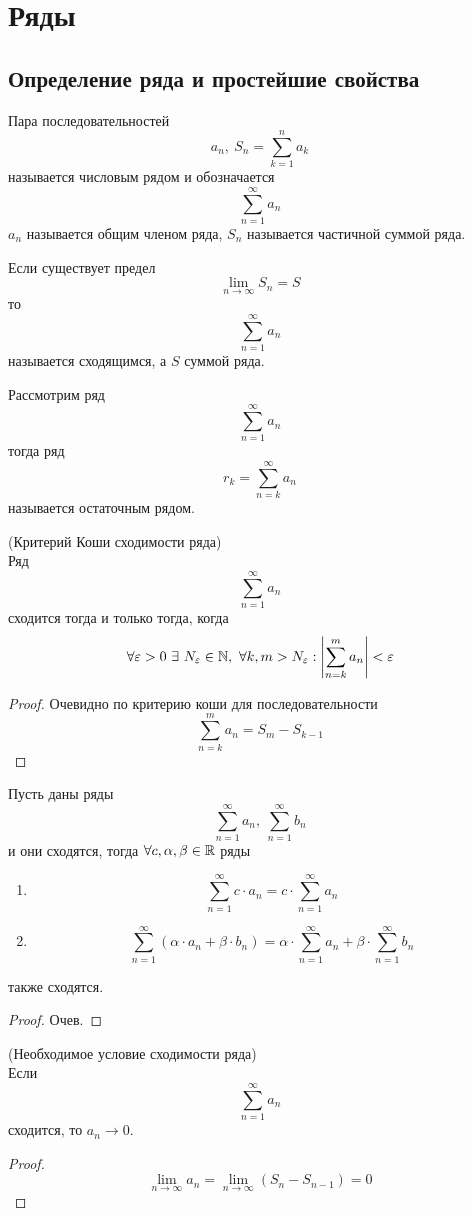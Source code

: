 \section{Ряды}
\subsection{Определение ряда и простейшие свойства}
\begin{definition}
    Пара последовательностей
    \[a_n,\ S_n=\sum_{k=1}^{n}a_k\]
    называется числовым рядом и обозначается
    \[\sum_{n=1}^{\infty}a_n\]
    $a_n$ называется общим членом ряда, $S_n$ называется частичной суммой ряда.
\end{definition}
\begin{definition}
    Если существует предел
    \[\lim\limits_{n\to \infty}S_n=S\]
    то 
    \[\sum_{n=1}^{\infty}a_n\]
    называется сходящимся, а $S$ суммой ряда.
\end{definition}
\begin{definition}
    Рассмотрим ряд
    \[\sum_{n=1}^{\infty}a_n\]
    тогда ряд 
    \[r_k=\sum_{n=k}^{\infty}a_n\]
    называется остаточным рядом.
\end{definition}
\begin{theorem}(Критерий Коши сходимости ряда)\\
    Ряд
    \[\sum_{n=1}^{\infty}a_n\]
    сходится тогда и только тогда, когда
    \[\forall \varepsilon>0\ \exists\ N_{\varepsilon}\in \mathbb{N},\ \forall k,m>N_{\varepsilon}: \left|\sum_{n=k}^{m}a_n\right|<\varepsilon\]
\end{theorem}
\begin{proof}
    Очевидно по критерию коши для последовательности
    \[\sum_{n=k}^{m}a_n=S_m-S_{k-1}\]
\end{proof}
\begin{theorem}
    Пусть даны ряды
    \[\sum_{n=1}^{\infty}a_n,\ \sum_{n=1}^{\infty}b_n\]
    и они сходятся, тогда $\forall c, \alpha, \beta\in \mathbb{R}$ ряды
    \begin{enumerate}
        \item
        \[\sum_{n=1}^{\infty}c\cdot a_n=c\cdot \sum_{n=1}^{\infty}a_n\]
        \item 
        \[\sum_{n=1}^{\infty}(\alpha\cdot a_n+\beta\cdot b_n)=\alpha\cdot \sum_{n=1}^{\infty}a_n+\beta\cdot \sum_{n=1}^{\infty}b_n\]
    \end{enumerate}
    также сходятся.
\end{theorem}
\begin{proof}
    Очев.
\end{proof}
\begin{theorem} (Необходимое условие сходимости ряда)\\
    Если
    \[\sum_{n=1}^{\infty}a_n\]
    сходится, то $a_n\to 0$.
\end{theorem}
\begin{proof}
    \[\lim\limits_{n\to\infty}a_n=\lim\limits_{n\to\infty}(S_n-S_{n-1})=0\]
\end{proof}
